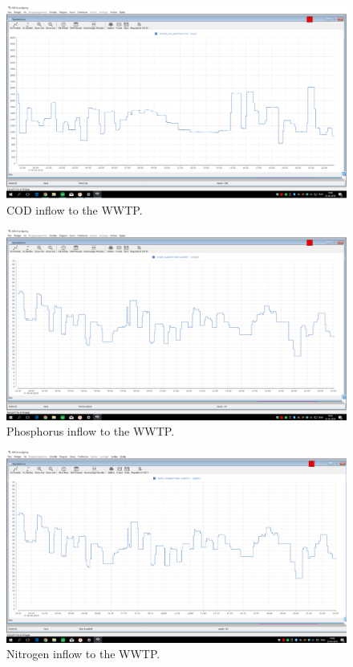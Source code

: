 \begin{figure}[H]
	\centering
	\includegraphics[width=0.95\textheight, angle=-90]{report/appendix/figures/COD_data.png}
	\caption{COD inflow to the WWTP.}
	\label{fig:COD_data}
\end{figure}

\begin{figure}[H]
	\centering
	\includegraphics[width=0.95\textheight, angle=-90]{report/appendix/figures/Forfos_data.png}
	\caption{Phosphorus inflow to the WWTP.}
	\label{fig:Forfos_data}
\end{figure}

\begin{figure}[H]
	\centering
	\includegraphics[width=0.95\textheight, angle=-90]{report/appendix/figures/kvaelstof_data.png}
	\caption{Nitrogen inflow to the WWTP.}
	\label{fig:kvaelstof_data}
\end{figure}